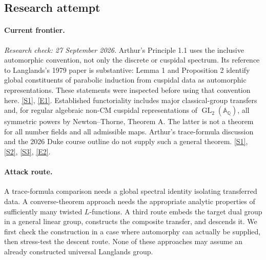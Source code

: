 \documentclass[11pt,a4paper]{article}
\newcommand{\Q}{\mathbb{Q}}
\newcommand{\A}{\mathbb{A}}
\newcommand{\sref}[2]{\hyperlink{source:#1:#2}{[S#2]}}
\newcommand{\eref}[2]{\hyperlink{extra:#1:#2}{[E#2]}}
\begin{document}
\subsection{Research attempt}
\paragraph{Current frontier.}
\textit{Research check: 27 September 2026.}
Arthur's Principle 1.1 uses the inclusive automorphic convention, not
only the discrete or cuspidal spectrum. Its reference to Langlands's
1979 paper is substantive: Lemma 1 and Proposition 2 identify global
constituents of parabolic induction from cuspidal data as automorphic
representations. These statements were inspected before using that
convention here. \sref{statement}{1}, \eref{statement}{1}.
Established functoriality includes major classical-group transfers and,
for regular algebraic non-CM cuspidal representations of
$\operatorname{GL}_2(\A_{\Q})$, all symmetric powers by Newton--Thorne,
Theorem A. The latter is not a theorem for all number fields and all
admissible maps. Arthur's trace-formula discussion and the 2026 Duke
course outline do not supply such a general theorem. \sref{statement}{1},
\sref{statement}{2}, \sref{statement}{3}, \eref{statement}{2}.

\paragraph{Attack route.}
A trace-formula comparison needs a global spectral identity isolating
transferred data. A converse-theorem approach needs the appropriate
analytic properties of sufficiently many twisted $L$-functions. A
third route embeds the target dual group in a general linear group,
constructs the composite transfer, and descends it. We first check the
construction in a case where automorphy can actually be supplied, then
stress-test the descent route. None of these approaches may assume an
already constructed universal Langlands group.
\end{document}
